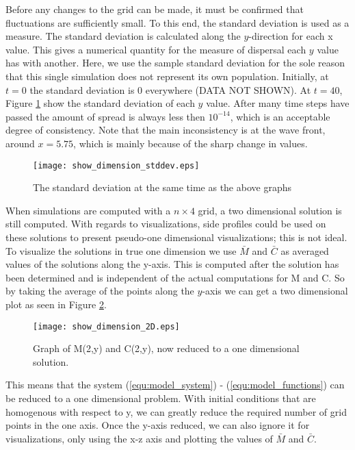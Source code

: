 Before any changes to the grid can be made, it must be confirmed that fluctuations are sufficiently small.
To this end, the standard deviation is used as a measure.
The standard deviation is calculated along the $y$-direction for each x value.
This gives a numerical quantity for the measure of dispersal each $y$ value has with another.
Here, we use the sample standard deviation for the sole reason that this single simulation does not represent its own population.
Initially, at $t =0$ the standard deviation is 0 everywhere (DATA NOT SHOWN).
At $t = 40$, Figure \ref{fig:show_dimension_stddev} show the standard deviation of each $y$ value.
After many time steps have passed the amount of spread is always less then $10^{-14}$, which is an acceptable degree of consistency.
Note that the main inconsistency is at the wave front, around $x = 5.75$, which is mainly because of the sharp change in values.

\begin{figure}[!htp]
  \centering
  \texttt{[image: show\_dimension\_stddev.eps]}
  \caption{The standard deviation at the same time as the above graphs}
  \label{fig:show_dimension_stddev}
\end{figure}

When simulations are computed with a $n \times 4$ grid, a two dimensional solution is still computed. 
With regards to visualizations, side profiles could be used on these solutions to present pseudo-one dimensional visualizations; this is not ideal.
To visualize the solutions in true one dimension we use $\bar{M}$ and $\bar{C}$ as averaged values of the solutions along the y-axis.
This is computed after the solution has been determined and is independent of the actual computations for M and C.
So by taking the average of the points along the $y$-axis we can get a two dimensional plot as seen in Figure \ref{fig:show_dimension_2D}. 
 
\begin{figure}[!htp]
  \centering
    \texttt{[image: show\_dimension\_2D.eps]}
    \caption{Graph of M(2,y) and C(2,y), now reduced to a one dimensional solution.}
    \label{fig:show_dimension_2D}
\end{figure}

This means that the system (\ref{equ:model_system}) - (\ref{equ:model_functions}) can be reduced to a one dimensional problem. 
With initial conditions that are homogenous with respect to y, we can greatly reduce the required number of grid points in the one axis.
Once the y-axis reduced, we can also ignore it for visualizations, only using the x-z axis and plotting the values of $\bar{M}$ and $\bar{C}$.


